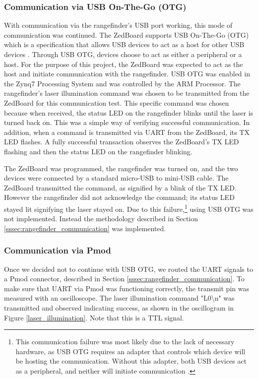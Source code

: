 \subsubsection{Communication via USB On-The-Go (OTG)}
With communication via the rangefinder's USB port working, this mode of communication was continued. The ZedBoard supports USB On-The-Go (OTG) which is a specification that allows USB devices to act as a host for other USB devices \cite{usb-otg}. Through USB OTG, devices choose to act as either a peripheral or a host. For the purpose of this project, the ZedBoard was expected to act as the host and initiate communication with the rangefinder. USB OTG was enabled in the Zynq7 Processing System and was controlled by the ARM Processor. The rangefinder's laser illumination command was chosen to be transmitted from the ZedBoard for this communication test. This specific command was chosen because when received, the status LED on the rangefinder blinks until the laser is turned back on. This was a simple way of verifying successful communication. In addition, when a command is transmitted via UART from the ZedBoard, its TX LED flashes. A fully successful transaction observes the ZedBoard's TX LED flashing and then the status LED on the rangefinder blinking.
\par
The ZedBoard was programmed, the rangefinder was turned on, and the two devices were connected by a standard micro-USB to mini-USB cable. The ZedBoard transmitted the command, as signified by a blink of the TX LED. However the rangefinder did not acknowledge the command; its status LED stayed lit signifying the laser stayed on. Due to this failure,\footnote{ This communication failure was most likely due to the lack of necessary hardware, as USB OTG requires an adapter that controls which device will be hosting the communication. Without this adapter, both USB devices act as a peripheral, and neither will initiate communication \cite{usb-otg}.} using USB OTG was not implemented. Instead the methodology described in Section \ref{sssec:rangefinder_communication} was implemented.

\subsubsection{Communication via Pmod}
Once we decided not to continue with USB OTG, we routed the UART signals to a Pmod connector, described in Section \ref{sssec:rangefinder_communication}. To make sure that UART via Pmod was functioning correctly, the transmit pin was measured with an oscilloscope. The laser illumination command "L0\textbackslash{}n" was transmitted and observed indicating success, as shown in the oscillogram in Figure \ref{laser_illumination}. Note that this is a TTL signal.

